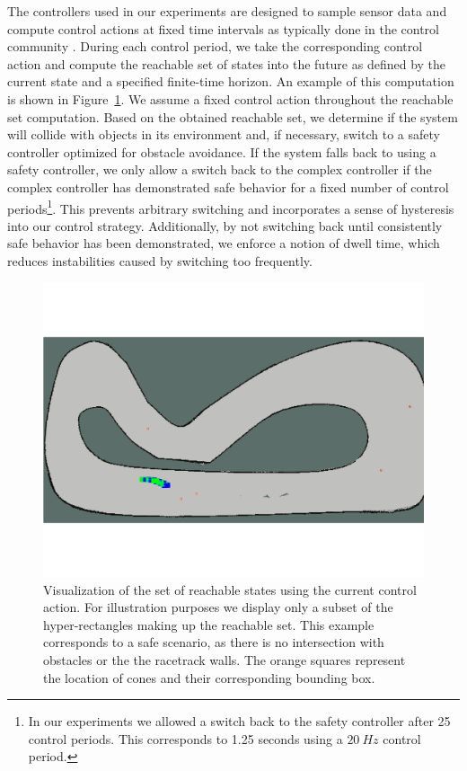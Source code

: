 \documentclass[manuscript,screen,review]{acmart}
\begin{document}
The controllers used in our experiments are designed to sample sensor data and compute control actions at fixed time intervals as typically done in the control community \cite{Dai2020}. During each control period, we take the corresponding control action and compute the reachable set of states into the future as defined by the current state and a specified finite-time horizon. An example of this computation is shown in Figure~\ref{fig:reachset}. We assume a fixed control action throughout the reachable set computation. Based on the obtained reachable set, we determine if the system will collide with objects in its environment and, if necessary, switch to a safety controller optimized for obstacle avoidance. If the system falls back to using a safety controller, we only allow a switch back to the complex controller if the complex controller has demonstrated safe behavior for a fixed number of control periods\footnote{In our experiments we allowed a switch back to the safety controller after 25 control periods. This corresponds to 1.25 seconds using a $20\ Hz$ control period.}. This prevents arbitrary switching and incorporates a sense of hysteresis into our control strategy. Additionally, by not switching back until consistently safe behavior has been demonstrated, we enforce a notion of dwell time, which reduces instabilities caused by switching too frequently. %


\begin{figure}[htpb]%
  \centering
    \includegraphics[width=0.75\linewidth]{figures/viz_option_two.pdf}
   \caption{Visualization of the set of reachable states using the current control action. For illustration purposes we display only a subset of the hyper-rectangles making up the reachable set. This example corresponds to a safe scenario, as there is no intersection with obstacles or the the racetrack walls. The orange squares represent the location of cones and their corresponding bounding box.}
  \label{fig:reachset}
\end{figure}
\end{document}
